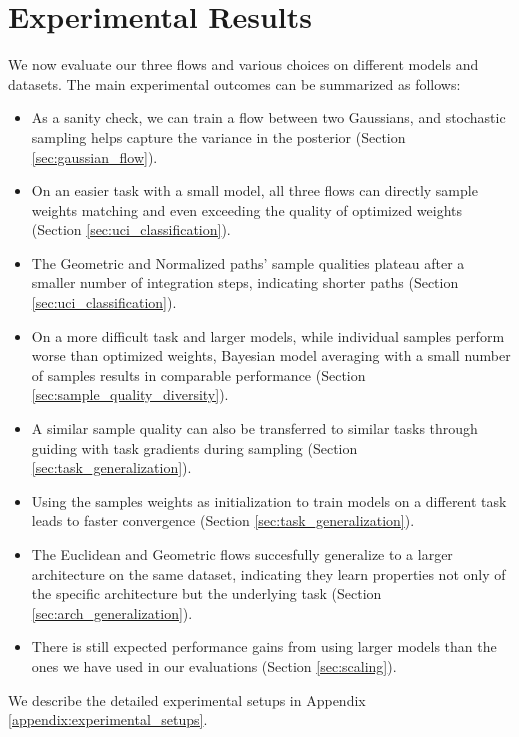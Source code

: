 
\chapter{Experimental Results}\label{chapter:results}

We now evaluate our three flows and various choices on different models and datasets. The main experimental outcomes can be summarized as follows:
\begin{itemize}
    \item As a sanity check, we can train a flow between two Gaussians, and stochastic sampling helps capture the variance in the posterior (Section \ref{sec:gaussian_flow}).
    \item On an easier task with a small model, all three flows can directly sample weights matching and even exceeding the quality of optimized weights (Section \ref{sec:uci_classification}).
    \item The Geometric and Normalized paths' sample qualities plateau after a smaller number of integration steps, indicating shorter paths (Section \ref{sec:uci_classification}).
    \item On a more difficult task and larger models, while individual samples perform worse than optimized weights, Bayesian model averaging with a small number of samples results in comparable performance (Section \ref{sec:sample_quality_diversity}).
    \item A similar sample quality can also be transferred to similar tasks through guiding with task gradients during sampling (Section \ref{sec:task_generalization}).
    \item Using the samples weights as initialization to train models on a different task leads to faster convergence (Section \ref{sec:task_generalization}).
    \item The Euclidean and Geometric flows succesfully generalize to a larger architecture on the same dataset, indicating they learn properties not only of the specific architecture but the underlying task (Section \ref{sec:arch_generalization}).
    \item There is still expected performance gains from using larger models than the ones we have used in our evaluations (Section \ref{sec:scaling}).
\end{itemize}

We describe the detailed experimental setups in Appendix \ref{appendix:experimental_setups}.

